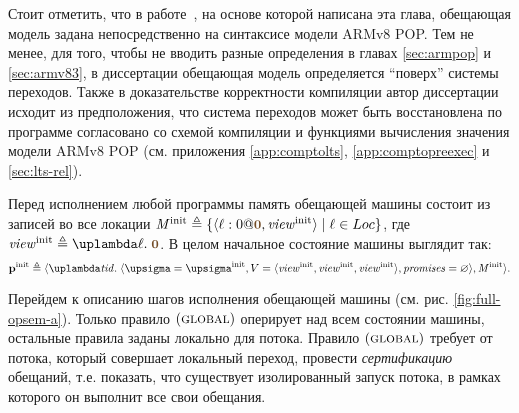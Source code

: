 Стоит отметить, что в работе~\cite{Podkopaev-al:ECOOP17}, на основе которой написана эта глава,
обещающая модель задана непосредственно на синтаксисе модели ARMv8 POP.
Тем не менее, для того, чтобы не вводить разные определения в главах \ref{sec:armpop} и
\ref{sec:armv83}, в диссертации обещающая модель определяется ``поверх'' системы переходов.
Также в доказательстве корректности компиляции автор диссертации исходит из предположения,
что система переходов может быть восстановлена
по программе согласовано со схемой компиляции и функциями вычисления значения модели ARMv8 POP
(см. приложения \ref{app:comptolts}, \ref{app:comptopreexec} и \ref{sec:lts-rel}).

Перед исполнением любой программы память обещающей машины состоит из записей во все локации
$\Mprom^{\rm init} \triangleq \{ \writeEvt{\loc}{0}{\tstamp{0}}{\R^{\rm init}} \mid \loc \in \Loc \}$,
где $\R^{\rm init} \triangleq \lambda \loc. \; \tstamp{0}$. В целом начальное состояние машины выглядит так:
\[
  \pinit \triangleq \angled{
     \lambda \tId. \; \angled{\pstate = \pstate^{\rm init},
                              \V = \angled{\R^{\rm init}, \R^{\rm init}, \R^{\rm init}}, \PromSet = \emptyset},
     \Mprom^{\rm init}}.
\]

Перейдем к описанию шагов исполнения обещающей машины (см. рис. \ref{fig:full-opsem-a}).
Только правило $(\textsc{global})$ оперирует над всем состоянии машины, остальные правила заданы локально для потока.
Правило $(\textsc{global})$ требует от потока, который совершает локальный переход, провести \emph{сертификацию} обещаний,
т.е. показать, что существует изолированный запуск потока, в рамках которого он выполнит все свои обещания.



